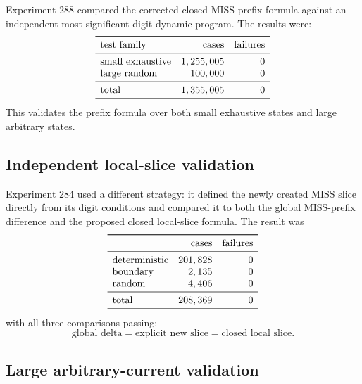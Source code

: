 \documentclass[11pt,a4paper]{article}
\theoremstyle{definition}
\theoremstyle{remark}
\begin{document}
Experiment 288 compared the corrected closed MISS-prefix formula against an independent most-significant-digit dynamic program.  The results were:
\[
\begin{array}{lrr}
\toprule
\text{test family} & \text{cases} & \text{failures}\\
\midrule
\text{small exhaustive} & 1,255,005 & 0\\
\text{large random} & 100,000 & 0\\
\midrule
\text{total} & 1,355,005 & 0\\
\bottomrule
\end{array}
\]
This validates the prefix formula over both small exhaustive states and large arbitrary states.

\subsection{Independent local-slice validation}

Experiment 284 used a different strategy: it defined the newly created MISS slice directly from its digit conditions and compared it to both the global MISS-prefix difference and the proposed closed local-slice formula.  The result was
\[
\begin{array}{lrr}
\toprule
&\text{cases}&\text{failures}\\
\midrule
\text{deterministic}&201,828&0\\
\text{boundary}&2,135&0\\
\text{random}&4,406&0\\
\midrule
\text{total}&208,369&0\\
\bottomrule
\end{array}
\]
with all three comparisons passing:
\[
\text{global delta}
=
\text{explicit new slice}
=
\text{closed local slice}.
\]

\subsection{Large arbitrary-current validation}
\end{document}
